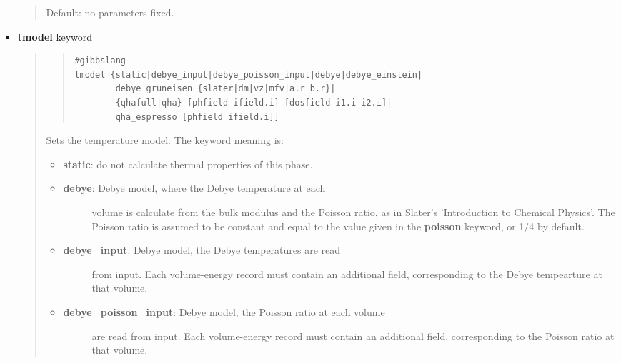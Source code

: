 \documentclass[a4paper]{article}
\begin{document}
\begin{itemize}
\begin{quote}
Default: no parameters fixed.
\end{quote}

\item \textbf{tmodel} keyword

\begin{quote}
\begin{quote}
\begin{verbatim}
#gibbslang
tmodel {static|debye_input|debye_poisson_input|debye|debye_einstein|
        debye_gruneisen {slater|dm|vz|mfv|a.r b.r}|
        {qhafull|qha} [phfield ifield.i] [dosfield i1.i i2.i]|
        qha_espresso [phfield ifield.i]]
\end{verbatim}
\end{quote}

Sets the temperature model. The keyword meaning is:

\begin{itemize}
\item \textbf{static}: do not calculate thermal properties of this phase.

\item 
\begin{description}
\item[{\textbf{debye}: Debye model, where the Debye temperature at each}] \leavevmode 
volume is calculate from the bulk modulus and the Poisson
ratio, as in Slater's 'Introduction to Chemical Physics'. The
Poisson ratio is assumed to be constant and equal to the value
given in the \textbf{poisson} keyword, or 1/4 by default.

\end{description}

\item 
\begin{description}
\item[{\textbf{debye\_input}: Debye model, the Debye temperatures are read}] \leavevmode 
from input. Each volume-energy record must contain an
additional field, corresponding to the Debye tempearture at
that volume.

\end{description}

\item 
\begin{description}
\item[{\textbf{debye\_poisson\_input}: Debye model, the Poisson ratio at each volume}] \leavevmode 
are read from input. Each volume-energy record must contain an
additional field, corresponding to the Poisson ratio at
that volume.


\end{description}
\end{itemize}
\end{quote}
\end{itemize}
\end{document}
